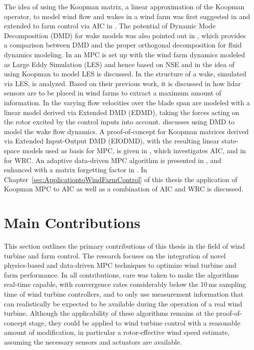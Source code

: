 The idea of using the Koopman matrix, a linear approximation of the Koopman operator, to model wind flow and wakes in a wind farm was first suggested in \cite{annoni2016wind} and extended to farm control via AIC in \cite{annoni2016sparsity}. The potential of Dynamic Mode Decomposition (DMD) for wake models was also pointed out in \cite{proctor2016including}, which provides a comparison between DMD and the proper orthogonal decomposition for fluid dynamics modeling. In \cite{munters2017optimal} an MPC is set up with the wind farm dynamics modeled as Large Eddy Simulation (LES) and hence based on NSE and in \cite{munters2018data} the idea of using Koopman to model LES is discussed. In \cite{debnath2017towards} the structure of a wake, simulated via LES, is analyzed. Based on their previous work, it is discussed in \cite{annoni2018sparse} how lidar sensors are to be placed in wind farms to extract a maximum amount of information. In \cite{ali2020data} the varying flow velocities over the blade span are modeled with a linear model derived via Extended DMD (EDMD), taking the forces acting on the rotor excited by the control inputs into account. \cite{chen2020data} discusses using DMD to model the wake flow dynamics. A proof-of-concept for Koopman matrices derived via Extended Input-Output DMD (EIODMD), with the resulting linear state-space models used as basis for MPC, is given in \cite{Cassamo.2020}, which investigates AIC, and in \cite{cassamo2021model} for WRC. An adaptive data-driven MPC algorithm is presented in \cite{cisneros2020data,calderon2021koopman}, and enhanced with a matrix forgetting factor in \cite{calderon2023data}. In Chapter~\ref{sec:ApplicationtoWindFarmControl} of this thesis the application of Koopman MPC to AIC as well as a combination of AIC and WRC is discussed.

\section{Main Contributions}
This section outlines the primary contributions of this thesis in the field of wind turbine and farm control. The research focuses on the integration of novel physics-based and data-driven MPC techniques to optimize wind turbine and farm performance. In all contributions, care was taken to make the algorithms real-time capable, with convergence rates considerably below the 10\,ms sampling time of wind turbine controllers, and to only use measurement information that can realistically be expected to be available during the operation of a real wind turbine. Although the applicability of these algorithms remains at the proof-of-concept stage, they could be applied to wind turbine control with a reasonable amount of modification, in particular a rotor-effective wind speed estimate,  assuming the necessary sensors and actuators are available.

